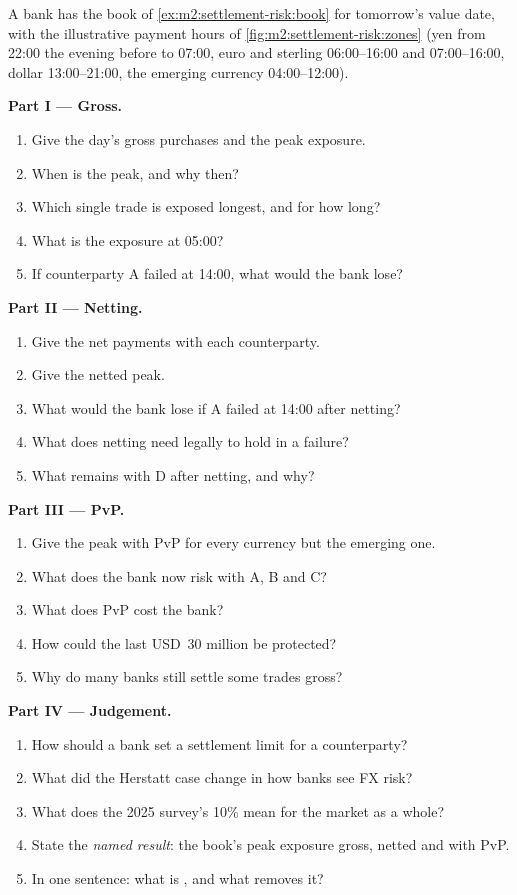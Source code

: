 \begin{problem}\label{pb:m2:settlement-risk:1}
A bank has the book of \cref{ex:m2:settlement-risk:book} for tomorrow's value date,
with the illustrative payment hours of \cref{fig:m2:settlement-risk:zones} (yen
from 22:00 the evening before to 07:00, euro and sterling 06:00--16:00 and
07:00--16:00, dollar 13:00--21:00, the emerging currency 04:00--12:00).

\medskip\noindent\textbf{Part I --- Gross.}
\begin{enumerate}
\item Give the day's gross purchases and the peak exposure.
\item When is the peak, and why then?
\item Which single trade is exposed longest, and for how long?
\item What is the exposure at 05:00?
\item If counterparty A failed at 14:00, what would the bank lose?
\end{enumerate}

\medskip\noindent\textbf{Part II --- Netting.}
\begin{enumerate}[resume]
\item Give the net payments with each counterparty.
\item Give the netted peak.
\item What would the bank lose if A failed at 14:00 after netting?
\item What does netting need legally to hold in a failure?
\item What remains with D after netting, and why?
\end{enumerate}

\medskip\noindent\textbf{Part III --- PvP.}
\begin{enumerate}[resume]
\item Give the peak with PvP for every currency but the emerging one.
\item What does the bank now risk with A, B and C?
\item What does PvP cost the bank?
\item How could the last USD~30 million be protected?
\item Why do many banks still settle some trades gross?
\end{enumerate}

\medskip\noindent\textbf{Part IV --- Judgement.}
\begin{enumerate}[resume]
\item How should a bank set a settlement limit for a counterparty?
\item What did the Herstatt case change in how banks see FX risk?
\item What does the 2025 survey's 10\% mean for the market as a whole?
\item State the \emph{named result}: the book's peak exposure gross, netted and
with PvP.
\item In one sentence: what is , and what removes it?
\end{enumerate}
\end{problem}

